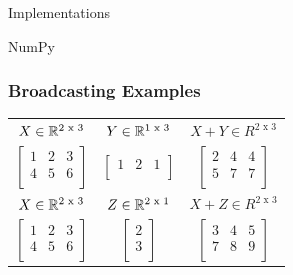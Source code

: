 \documentclass{beamer}
\theoremstyle{case}
\begin{document}
\begin{section}{Implementations}
\begin{subsection}{NumPy}
\begin{frame}
    \frametitle{Broadcasting Examples}
    \begin{center}
    \def\arraystretch{1.5}
    \begin{tabular}{ c c | c }
        $ X \in \mathbb{R}^{2 \text{ x } 3} $ & $ Y \in \mathbb{R}^{1 \text{ x } 3} $ & $ X + Y \in R^{2 \text{ x } 3} $ \\
        $
            \begin{bmatrix}
                1 & 2 & 3 \\
                4 & 5 & 6 \\
            \end{bmatrix}
        $ &
        $
            \begin{bmatrix}
            1 & 2 & 1 \\
            \end{bmatrix}
        $ &
        $
            \begin{bmatrix}
                2 & 4 & 4 \\
                5 & 7 & 7 \\
            \end{bmatrix}
        $ \\
        $ X \in \mathbb{R}^{2 \text{ x } 3} $ & $ Z \in \mathbb{R}^{2 \text{ x } 1} $ & $ X + Z \in R^{2 \text{ x } 3} $ \\
        $
            \begin{bmatrix}
                1 & 2 & 3 \\
                4 & 5 & 6 \\
            \end{bmatrix}
        $ &
        $
            \begin{bmatrix}
            2 \\
            3 \\
            \end{bmatrix}
        $ &
        $
            \begin{bmatrix}
                3 & 4 & 5 \\
                7 & 8 & 9 \\
            \end{bmatrix}
        $ \\
    \end{tabular}
    \end{center}


\end{frame}
\end{subsection}
\end{section}
\end{document}

